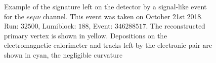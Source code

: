 \begin{figure}
  \centering
  \vfil
  \caption{Example of the signature left on the detector by a signal-like event
    for the $ee\mu\nu$ channel. This event was taken on October 21st 2018. Run: $32500$,
    Lumiblock: $188$, Event: $346288517$. The reconstructed primary vertex is shown in yellow.
    Depositions on the electromagnetic calorimeter
    and tracks left by the electronic pair are shown in cyan, the negligible curvature
}
\end{figure}
